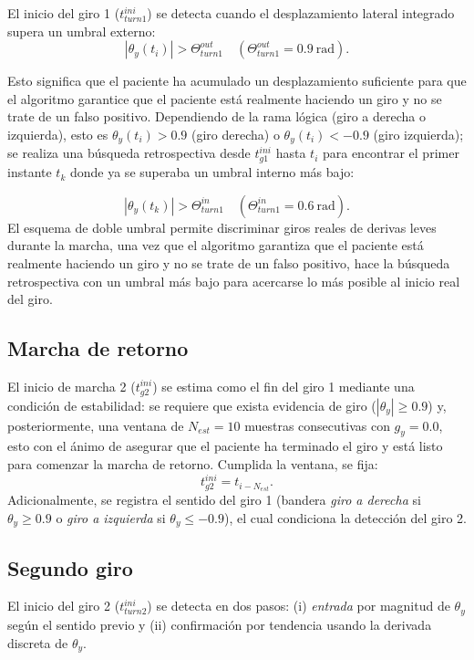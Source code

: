 \documentclass[12pt]{report}
\begin{document}
\begin{justify}
    El inicio del giro 1 ($t_{turn1}^{ini}$) se detecta cuando el desplazamiento lateral integrado supera un umbral externo:
    \[
        |\theta_y(t_i)|>\Theta_{turn1}^{out}\quad (\Theta_{turn1}^{out}=0.9~\text{rad}).
    \]

    Esto significa que el paciente ha acumulado un desplazamiento suficiente para que el algoritmo garantice que el paciente está realmente haciendo un giro y no se trate de un falso positivo. Dependiendo de la rama lógica (giro a derecha o izquierda), esto es $\theta_y(t_i) > 0.9$ (giro derecha) o $\theta_y(t_i) < -0.9$ (giro izquierda); se realiza una búsqueda retrospectiva desde $t_{g1}^{ini}$ hasta $t_i$ para encontrar el primer instante $t_k$ donde ya se superaba un umbral interno más bajo:

    \[
        |\theta_y(t_k)|>\Theta_{turn1}^{in}\quad (\Theta_{turn1}^{in}=0.6~\text{rad}).
    \]
    El esquema de doble umbral permite discriminar giros reales de derivas leves durante la marcha, una vez que el algoritmo garantiza que el paciente está realmente haciendo un giro y no se trate de un falso positivo, hace la búsqueda retrospectiva con un umbral más bajo para acercarse lo más posible al inicio real del giro.

    \subsection{Marcha de retorno}
    \label{subsec:gait2}

    El inicio de marcha 2 ($t_{g2}^{ini}$) se estima como el fin del giro 1 mediante una condición de estabilidad: se requiere que exista evidencia de giro ($|\theta_y|\ge 0.9$) y, posteriormente, una ventana de $N_{est}=10$ muestras consecutivas con $g_y=0.0$, esto con el ánimo de asegurar que el paciente ha terminado el giro y está listo para comenzar la marcha de retorno. Cumplida la ventana, se fija:
    \[
        t_{g2}^{ini}=t_{i-N_{est}}.
    \]
    Adicionalmente, se registra el sentido del giro 1 (bandera \textit{giro a derecha} si $\theta_y\ge 0.9$ o \textit{giro a izquierda} si $\theta_y\le -0.9$), el cual condiciona la detección del giro 2.

    \subsection{Segundo giro}
    \label{subsec:turn2}

    El inicio del giro 2 ($t_{turn2}^{ini}$) se detecta en dos pasos: (i) \textit{entrada} por magnitud de $\theta_y$ según el sentido previo y (ii) confirmación por tendencia usando la derivada discreta de $\theta_y$.


\end{justify}
\end{document}
